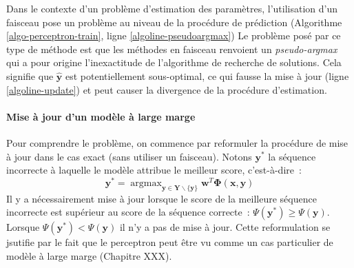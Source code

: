 \documentclass[11pt,openany]{book}
\begin{document}
Dans le contexte d'un problème d'estimation des paramètres,
l'utilisation d'un faisceau pose un problème au niveau de la procédure
de prédiction (Algorithme  \ref{algo-perceptron-train}, ligne \ref{algoline-pseudoargmax})
Le problème posé par ce type de méthode est que les méthodes en
faisceau renvoient un {\sl pseudo-argmax} qui a pour origine
l'inexactitude de l'algorithme de recherche de solutions.
Cela signifie que $\hat{\mathbf{y}}$ est potentiellement sous-optimal,
ce qui fausse la mise à jour (ligne \ref{algoline-update}) et peut
causer la divergence de la procédure d'estimation.

\paragraph{Mise à jour d'un modèle à large marge}
Pour comprendre le problème, on commence par reformuler la procédure 
de mise à jour dans le cas exact (sans utiliser un faisceau). Notons  $\mathbf{y}^*$ la séquence
incorrecte à laquelle le modèle attribue le meilleur score, c'est-à-dire~:
\begin{displaymath}
\mathbf{y}^* = \mathop{\text{argmax}}_{\mathbf{y} \in
  \mathbf{Y}\backslash \{\mathbf{y}\}} \mathbf{w}^T \boldsymbol\Phi(\mathbf{x},\mathbf{y})
\end{displaymath}
Il y a nécessairement mise à jour lorsque le score de la meilleure séquence
incorrecte est supérieur au score de la séquence correcte~: $\Psi(\mathbf{y}^*) \geq \Psi(\mathbf{y})$.
Lorsque $\Psi(\mathbf{y}^*) <\Psi(\mathbf{y})$ il n'y a pas de mise à
jour. Cette reformulation se jsutifie par le fait que le perceptron
peut être vu comme un cas particulier de modèle à large marge
(Chapitre XXX). 
\end{document}
